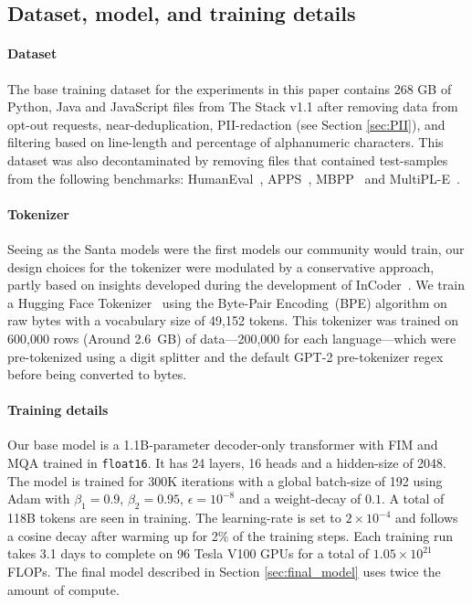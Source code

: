 \documentclass[10pt]{article} \usepackage{iclr2023_conference,times}
\begin{document}
\subsection{Dataset, model, and training details}\label{sec:dataset_model}
\paragraph{Dataset} The base training dataset for the experiments in this paper contains 268 GB of Python, Java and JavaScript files from The Stack v1.1 \citep{Kocetkov2022TheStack} after removing data from opt-out requests, near-deduplication, PII-redaction (see Section \ref{sec:PII}), and filtering based on line-length and percentage of alphanumeric characters. This dataset was also decontaminated by removing files that contained test-samples from the following benchmarks: HumanEval~\citep{chen2021codex}, APPS~\citep{hendrycks2021measuring}, MBPP~\citep{austin2021program} and MultiPL-E~\citep{cassano2022multiple}.


\paragraph{Tokenizer}
Seeing as the Santa models were the first models our community would train, our design choices for the tokenizer were modulated by a conservative approach, partly based on insights developed during the development of InCoder~\citep{fried2022incoder}. We train a Hugging Face Tokenizer~\citep{anthony_moi_2022_hftokenizers} using the Byte-Pair Encoding~(BPE) algorithm on raw bytes with a vocabulary size of 49,152 tokens. This tokenizer was trained on 600,000 rows (Around 2.6 GB) of data---200,000 for each language---which were pre-tokenized using a digit splitter and the default GPT-2 pre-tokenizer regex before being converted to bytes.



\paragraph{Training details} Our base model is a 1.1B-parameter decoder-only transformer with FIM and MQA trained in \texttt{float16}. It has 24 layers, 16 heads and a hidden-size of 2048. The model is trained for 300K iterations with a global batch-size of 192 using Adam \citep{DBLP:journals/corr/KingmaB14} with $\beta_1=0.9$, $\beta_2=0.95$, $\epsilon=10^{-8}$ and a weight-decay of $0.1$. A total of 118B tokens are seen in training. The learning-rate is set to $2\times10^{-4}$ and follows a cosine decay after warming up for 2\% of the training steps.
Each training run takes 3.1 days to complete on 96 Tesla V100 GPUs for a total of $1.05 \times 10^{21}$ FLOPs.
The final model described in Section \ref{sec:final_model} uses twice the amount of compute.
\end{document}
